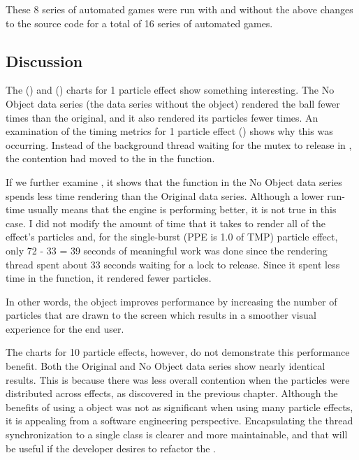 These 8 series of automated games were run with and without the above changes to the source code for a total of 16 series of automated games.

\subsection{Discussion}\label{ssec:observe_copies_discussion}

The  () and  () charts for 1 particle effect show something interesting. The No Object data series (the data series without the  object) rendered the ball fewer times than the original, and it also rendered its particles fewer times. An examination of the timing metrics for 1 particle effect () shows why this was occurring. Instead of the background thread waiting for the mutex to release in , the contention had moved to the  in the  function.  

If we further examine , it shows that the  function in the No Object data series spends less time rendering than the Original data series. Although a lower run-time usually means that the engine is performing better, it is not true in this case. I did not modify the amount of time that it takes to render all of the effect's particles and, for the single-burst (PPE is 1.0 of TMP) particle effect, only 72 - 33 =  39 seconds of meaningful work was done since the rendering thread spent about 33 seconds waiting for a lock to release. Since it spent less time in the  function, it rendered fewer particles. 

In other words, the  object improves performance by increasing the number of particles that are drawn to the screen which results in a smoother visual experience for the end user.

The charts for 10 particle effects, however, do not demonstrate this performance benefit. Both the Original and No Object data series show nearly identical results. This is because there was less overall contention when the particles were distributed across effects, as discovered in the previous chapter. Although the benefits of using a  object was not as significant when using many particle effects, it is appealing from a software engineering perspective. Encapsulating the thread synchronization to a single class is clearer and more maintainable, and that will be useful if the developer desires to refactor the .


